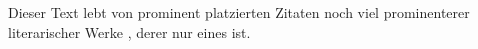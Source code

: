 Dieser Text lebt von prominent platzierten Zitaten \cite[u.\thinspace a.][]{Frank1957} noch viel prominenterer literarischer Werke \cite[vgl.][S. 7]{Orwell1957}, derer \cite{Hawking1988} nur eines ist.

